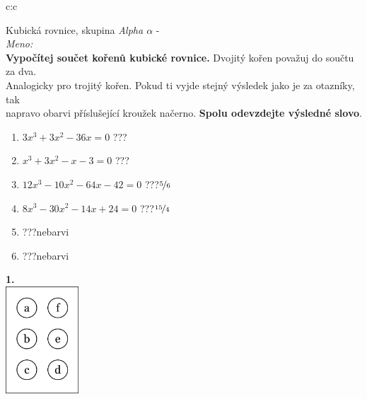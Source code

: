 \documentclass[10pt]{report}
\begin{document}
\thispagestyle{empty}
\begin{tabular}{c:c}
\begin{minipage}[c][99mm][t]{0.49\linewidth}
\begin{center}
\vspace{7mm}
{\huge Kubická rovnice, skupina \textit{Alpha $\alpha$} -}\\[4.5mm]
\textit{Meno:}\phantom{xxxxxxxxxxxxxxxxxxxxxxxxxxxxxxxxxxxxxxxxxxxxxxxxxxxxxxxxxxxxxxxxx}\\[3.5mm]
\textbf{Vypočítej součet kořenů kubické rovnice.} Dvojitý kořen považuj do součtu za dva.\\Analogicky pro trojitý kořen. Pokud ti vyjde stejný výsledek jako je za otazníky, tak\\napravo obarvi příslušející kroužek načerno. \textbf{Spolu odevzdejte výsledné slovo}.\\[3mm]
\begin{minipage}{0.77\linewidth}
\begin{center}
\begin{varwidth}{\textwidth}
\begin{enumerate}
\large
\item $3x^3+3x^2-36x=0$\quad \dotfill\; ???\;\dotfill {}
\item $x^3+3x^2-x-3=0$\quad \dotfill\; ???\;\dotfill {}
\item $12x^3-10x^2-64x-42=0$\quad \dotfill\; ???\;\dotfill \quad $\nicefrac{5}{6}$
\item $8x^3-30x^2-14x+24=0$\quad \dotfill\; ???\;\dotfill \quad $\nicefrac{15}{4}$
\item \quad \dotfill\; ???\;\dotfill \quad nebarvi
\item \quad \dotfill\; ???\;\dotfill \quad nebarvi
\end{enumerate}
\end{varwidth}
\end{center}
\end{minipage}
\begin{minipage}{0.20\linewidth}
\begin{center}
{\Huge\bfseries 1.} \\[2mm]
\includegraphics[height=40mm]{../images/braille.png}

\end{center}
\end{minipage}
\end{center}
\end{minipage}
\end{tabular}
\end{document}
